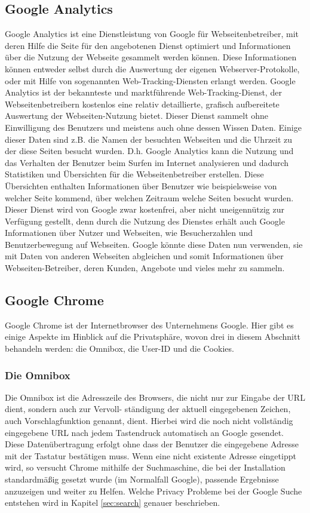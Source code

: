\documentclass[12pt, a4paper]{llncs}
\begin{document}
	\subsection{Google Analytics}
	Google Analytics ist eine Dienstleistung von Google für Webseitenbetreiber, mit deren Hilfe die Seite für den angebotenen Dienst optimiert und Informationen über die Nutzung der Webseite gesammelt werden können. Diese Informationen können entweder selbst durch die Auswertung der eigenen Webserver-Protokolle, oder mit Hilfe von sogenannten Web-Tracking-Diensten erlangt werden.
	Google Analytics ist der bekannteste und marktführende Web-Tracking-Dienst, der Webseitenbetreibern kostenlos eine relativ detaillierte, grafisch aufbereitete Auswertung der
	Webseiten-Nutzung bietet. Dieser Dienst sammelt ohne Einwilligung des Benutzers und meistens auch ohne dessen Wissen Daten. Einige dieser Daten sind z.B. die Namen der besuchten Webseiten und die Uhrzeit zu der diese Seiten besucht wurden. D.h. Google Analytics kann die Nutzung und das Verhalten der Benutzer beim Surfen im Internet analysieren und dadurch Statistiken und Übersichten für die Webseitenbetreiber erstellen. Diese Übersichten enthalten Informationen über Benutzer wie beispielsweise von welcher Seite kommend, über welchen Zeitraum welche Seiten besucht wurden.
	Dieser Dienst wird von Google zwar kostenfrei, aber nicht uneigennützig zur Verfügung gestellt, denn durch die Nutzung des Dienstes erhält auch Google Informationen über Nutzer und Webseiten, wie Besucherzahlen und Benutzerbewegung auf Webseiten. Google könnte diese Daten nun verwenden, sie mit Daten von anderen Webseiten abgleichen und somit Informationen über Webseiten-Betreiber, deren Kunden, Angebote und vieles mehr zu sammeln\cite{1}.
	
	\subsection{Google Chrome}
	Google Chrome ist der Internetbrowser des Unternehmens Google. Hier gibt es einige Aspekte im Hinblick auf die Privatsphäre, wovon drei in diesem Abschnitt behandeln werden: die Omnibox, die User-ID und die Cookies. 
	
	\subsubsection{Die Omnibox}
	Die Omnibox ist die Adresszeile des Browsers, die nicht nur zur Eingabe der URL dient, sondern auch zur Vervoll- ständigung der aktuell eingegebenen Zeichen, auch Vorschlagfunktion genannt, dient. Hierbei wird die noch nicht vollständig eingegebene URL nach jedem Tastendruck automatisch an Google gesendet. Diese Datenübertragung erfolgt ohne dass der Benutzer die eingegebene Adresse mit der Tastatur bestätigen muss. Wenn eine nicht existente Adresse eingetippt wird, so versucht Chrome mithilfe der Suchmaschine, die bei der Installation standardmäßig gesetzt wurde (im Normalfall Google), passende Ergebnisse anzuzeigen und weiter zu Helfen\cite{2}. Welche Privacy Probleme bei der Google Suche entstehen wird in Kapitel \ref{sec:search} genauer beschrieben.
\end{document}
